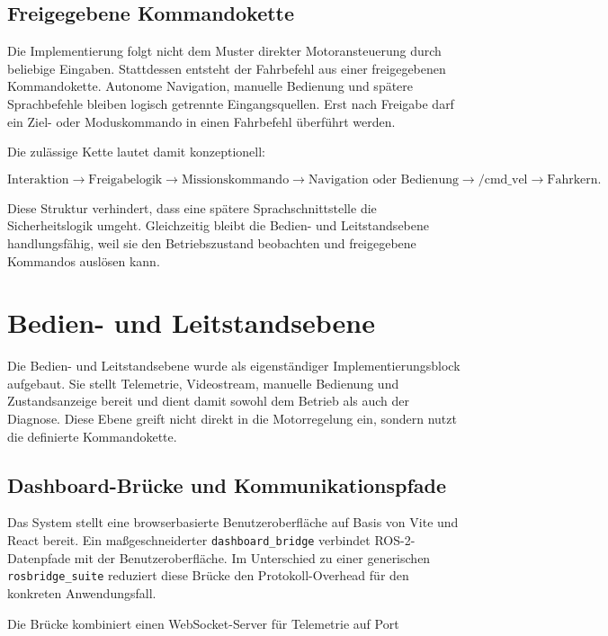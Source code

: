 \subsection{Freigegebene Kommandokette}

Die Implementierung folgt nicht dem Muster direkter Motoransteuerung durch beliebige Eingaben. Stattdessen entsteht der Fahrbefehl aus einer freigegebenen Kommandokette. Autonome Navigation, manuelle Bedienung und spätere Sprachbefehle bleiben logisch getrennte Eingangsquellen. Erst nach Freigabe darf ein Ziel- oder Moduskommando in einen Fahrbefehl überführt werden.

Die zulässige Kette lautet damit konzeptionell:

$$\text{Interaktion} \rightarrow \text{Freigabelogik} \rightarrow \text{Missionskommando} \rightarrow \text{Navigation oder Bedienung} \rightarrow /\text{cmd\_vel} \rightarrow \text{Fahrkern}.$$

Diese Struktur verhindert, dass eine spätere Sprachschnittstelle die Sicherheitslogik umgeht. Gleichzeitig bleibt die Bedien- und Leitstandsebene handlungsfähig, weil sie den Betriebszustand beobachten und freigegebene Kommandos auslösen kann.

\section{Bedien- und Leitstandsebene}

Die Bedien- und Leitstandsebene wurde als eigenständiger Implementierungsblock aufgebaut. Sie stellt Telemetrie, Videostream, manuelle Bedienung und Zustandsanzeige bereit und dient damit sowohl dem Betrieb als auch der Diagnose. Diese Ebene greift nicht direkt in die Motorregelung ein, sondern nutzt die definierte Kommandokette.

\subsection{Dashboard-Brücke und Kommunikationspfade}

Das System stellt eine browserbasierte Benutzeroberfläche auf Basis von Vite und React bereit. Ein maßgeschneiderter \texttt{dashboard\_bridge} verbindet ROS-2-Datenpfade mit der Benutzeroberfläche. Im Unterschied zu einer generischen \texttt{rosbridge\_suite} reduziert diese Brücke den Protokoll-Overhead für den konkreten Anwendungsfall.

Die Brücke kombiniert einen WebSocket-Server für Telemetrie auf Port

